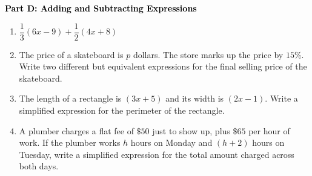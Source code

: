 \documentclass[12pt, letterpaper, fleqn]{article}
\begin{document}
\newpage

\begin{tcolorbox}[colback=customteal!20]
\large\textcolor{black}{\textbf{Part D: Adding and Subtracting Expressions}}
\end{tcolorbox}

\vspace{3mm}

\begin{enumerate}[itemsep=2.5cm, leftmargin=0.6cm, resume]
\item $\dfrac{1}{3}(6x - 9) + \dfrac{1}{2}(4x + 8)$
\item The price of a skateboard is $p$ dollars. The store marks up the price by $15\%$. Write two different but equivalent expressions for the final selling price of the skateboard.
\item The length of a rectangle is $(3x + 5)$ and its width is $(2x - 1)$. Write a simplified expression for the perimeter of the rectangle.
\item A plumber charges a flat fee of $\$50$ just to show up, plus $\$65$ per hour of work. If the plumber works $h$ hours on Monday and $(h + 2)$ hours on Tuesday, write a simplified expression for the total amount charged across both days.
\end{enumerate}
\end{document}
